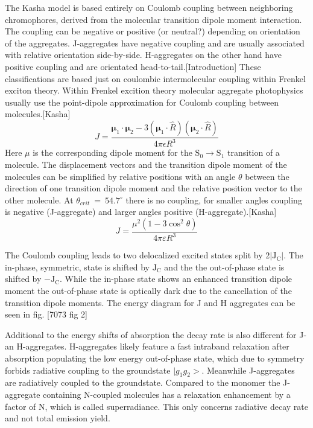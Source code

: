 \documentclass{article}
\begin{document}
\begin{multicols}{2}
The Kasha model is based entirely on Coulomb coupling between neighboring chromophores, derived from the molecular transition dipole moment interaction. The coupling can be negative or positive (or neutral?) depending on orientation of the aggregates. J-aggregates have negative coupling and are usually associated with relative orientation side-by-side. H-aggregates on the other hand have positive coupling and are orientated head-to-tail.[Introduction]\cite{Hestand2018}
These classifications are based just on coulombic intermolecular coupling within Frenkel exciton theory. Within Frenkel excition theory molecular aggregate photophysics usually use the point-dipole approximation for Coulomb coupling between molecules.\cite{Hestand2018}[Kasha]
\begin{equation}
J=\frac{\boldsymbol{\mu}_1 \cdot \boldsymbol{\mu}_2-3\left(\boldsymbol{\mu}_1 \cdot \hat{R}\right)\left(\boldsymbol{\mu}_2 \cdot \hat{R}\right)}{4 \pi \epsilon R^3}
\end{equation}
Here $\mu$ is the corresponding dipole moment for the $\mathrm{S_0 \rightarrow S_1}$ transition of a molecule. The displacement vectors and the transition dipole moment of the molecules can be simplified by relative positions with an angle $\theta$ between the direction of one transition dipole moment and the relative position vector to the other molecule. At $\theta_{crit} \: = \: 54.7^\circ$ there is no coupling, for smaller angles coupling is negative (J-aggregate) and larger angles positive (H-aggregate).\cite{Hestand2018}[Kasha]
\begin{equation}
J=\frac{\mu^2\left(1-3 \cos ^2 \theta\right)}{4 \pi \varepsilon R^3}
\end{equation}

The Coulomb coupling leads to two delocalized excited states split by 2$|\mathrm{J_C}|$. The in-phase, symmetric, state is shifted by $\mathrm{J_C}$ and the the out-of-phase state is shifted by $-\mathrm{J_C}$. While the in-phase state shows an enhanced transition dipole moment the out-of-phase state is optically dark due to the cancellation of the transition dipole moments. The energy diagram for J and H aggregates can be seen in fig. \cite{Hestand2018}[7073 fig 2]

Additional to the energy shifts of absorption the decay rate is also different for J- an H-aggregates. H-aggregates likely feature a fast intraband relaxation after absorption populating the low energy out-of-phase state, which due to symmetry forbids radiative coupling to the groundstate $|g_1 g_2>$. Meanwhile J-aggregates are radiatively coupled to the groundstate. Compared to the monomer the J-aggregate containing N-coupled molecules has a relaxation enhancement by a factor of N, which is called superradiance. This only concerns radiative decay rate and not total emission yield.\cite{Hestand2018}  


\end{multicols}
\end{document}
